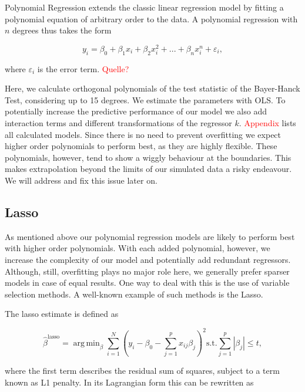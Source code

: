 \documentclass[12pt,a4paper]{article}
\DeclareMathOperator*{\argmin}{arg\,min}
\begin{document}
Polynomial Regression extends the classic linear regression model by
fitting a polynomial equation of arbitrary order to the data. A
polynomial regression with \(n\) degrees thus takes the form

\begin{equation}
    y_i = \beta_0 + \beta_1 x_i + \beta_2 x_i^2 + ... + \beta_n x_i^n + \varepsilon_i,
\label{eq:7}
\end{equation}

where \(\varepsilon_i\) is the error term. \textcolor{red}{Quelle?}

Here, we calculate orthogonal polynomials of the test statistic of the
Bayer-Hanck Test, considering up to 15 degrees. We estimate the
parameters with OLS. To potentially increase the predictive performance
of our model we also add interaction terms and different transformations
of the regressor \(k\). \textcolor{red}{Appendix} lists all calculated
models. Since there is no need to prevent overfitting we expect higher
order polynomials to perform best, as they are highly flexible. These
polynomials, however, tend to show a wiggly behaviour at the boundaries.
This makes extrapolation beyond the limits of our simulated data a risky
endeavour. We will address and fix this issue later on.

\hypertarget{section}{%
\subsection{\texorpdfstring{\ac{Lasso}}{}}\label{section}}

As mentioned above our polynomial regression models are likely to
perform best with higher order polynomials. With each added polynomial,
however, we increase the complexity of our model and potentially add
redundant regressors. Although, still, overfitting plays no major role
here, we generally prefer sparser models in case of equal results. One
way to deal with this is the use of variable selection methods. A
well-known example of such methods is the \ac{Lasso}.

The lasso estimate is defined as

\begin{equation}
    \hat{\beta}^{\text{lasso}} = \argmin_{\beta} \sum^N_{i=1} \left( y_i - \beta_0 - \sum^p_{j=1} x_{ij} \beta_j \right)^2
    \text{s.t.} \sum^p_{j=1} |\beta_j | \leq t, 
\label{eq:8}
\end{equation}

where the first term describes the residual sum of squares, subject to a
term known as L1 penalty. In its Lagrangian form this can be rewritten
as
\end{document}
